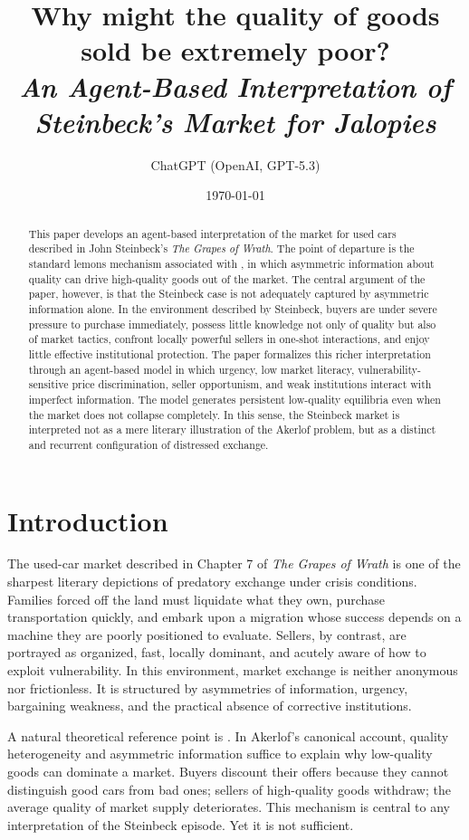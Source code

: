 \documentclass[12pt]{article}
\title{\Large{Why might the quality of goods sold be extremely poor?}\\\large{\textit{An Agent-Based Interpretation of Steinbeck's Market for Jalopies}}}
\author{ChatGPT (OpenAI, GPT-5.3)}
\date{\today}
\begin{document}
\maketitle

\begin{abstract}
This paper develops an agent-based interpretation of the market for used cars described in John Steinbeck's \textit{The Grapes of Wrath}. The point of departure is the standard lemons mechanism associated with \citet{akerlof1970}, in which asymmetric information about quality can drive high-quality goods out of the market. The central argument of the paper, however, is that the Steinbeck case is not adequately captured by asymmetric information alone. In the environment described by Steinbeck, buyers are under severe pressure to purchase immediately, possess little knowledge not only of quality but also of market tactics, confront locally powerful sellers in one-shot interactions, and enjoy little effective institutional protection. The paper formalizes this richer interpretation through an agent-based model in which urgency, low market literacy, vulnerability-sensitive price discrimination, seller opportunism, and weak institutions interact with imperfect information. The model generates persistent low-quality equilibria even when the market does not collapse completely. In this sense, the Steinbeck market is interpreted not as a mere literary illustration of the Akerlof problem, but as a distinct and recurrent configuration of distressed exchange.
\end{abstract}

\section{Introduction}

The used-car market described in Chapter 7 of \textit{The Grapes of Wrath} is one of the sharpest literary depictions of predatory exchange under crisis conditions. Families forced off the land must liquidate what they own, purchase transportation quickly, and embark upon a migration whose success depends on a machine they are poorly positioned to evaluate. Sellers, by contrast, are portrayed as organized, fast, locally dominant, and acutely aware of how to exploit vulnerability. In this environment, market exchange is neither anonymous nor frictionless. It is structured by asymmetries of information, urgency, bargaining weakness, and the practical absence of corrective institutions.

A natural theoretical reference point is \citet{akerlof1970}. In Akerlof's canonical account, quality heterogeneity and asymmetric information suffice to explain why low-quality goods can dominate a market. Buyers discount their offers because they cannot distinguish good cars from bad ones; sellers of high-quality goods withdraw; the average quality of market supply deteriorates. This mechanism is central to any interpretation of the Steinbeck episode. Yet it is not sufficient.
\end{document}
